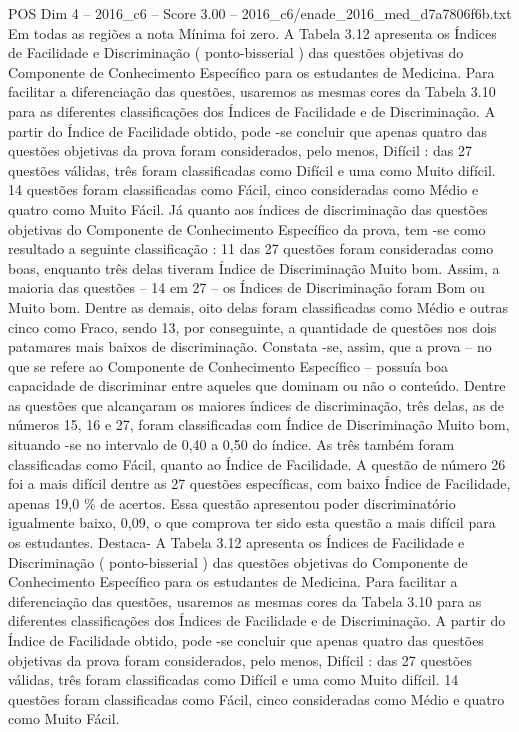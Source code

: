 \begin{textsample}{POS Dim 4 – 2016\_c6 – Score 3.00 – 2016\_c6/enade\_2016\_med\_d7a7806f6b.txt}
Em todas as regiões a nota Mínima foi zero.
A Tabela 3.12 apresenta os Índices de Facilidade e Discriminação ( ponto-bisserial ) das questões objetivas do Componente de Conhecimento Específico para os estudantes de Medicina.
Para facilitar a diferenciação das questões, usaremos as mesmas cores da Tabela 3.10 para as diferentes classificações dos Índices de Facilidade e de Discriminação.
A partir do Índice de Facilidade obtido, pode -se concluir que apenas quatro das questões objetivas da prova foram considerados, pelo menos, Difícil : das 27 questões válidas, três foram classificadas como Difícil e uma como Muito difícil. 14 questões foram classificadas como Fácil, cinco consideradas como Médio e quatro como Muito Fácil.
Já quanto aos índices de discriminação das questões objetivas do Componente de Conhecimento Específico da prova, tem -se como resultado a seguinte classificação : 11 das 27 questões foram consideradas como boas, enquanto três delas tiveram Índice de Discriminação Muito bom.
Assim, a maioria das questões – 14 em 27 – os Índices de Discriminação foram Bom ou Muito bom.
Dentre as demais, oito delas foram classificadas como Médio e outras cinco como Fraco, sendo 13, por conseguinte, a quantidade de questões nos dois patamares mais baixos de discriminação.
Constata -se, assim, que a prova – no que se refere ao Componente de Conhecimento Específico – possuía boa capacidade de discriminar entre aqueles que dominam ou não o conteúdo.
Dentre as questões que alcançaram os maiores índices de discriminação, três delas, as de números 15, 16 e 27, foram classificadas com Índice de Discriminação Muito bom, situando -se no intervalo de 0,40 a 0,50 do índice.
As três também foram classificadas como Fácil, quanto ao Índice de Facilidade.
A questão de número 26 foi a mais difícil dentre as 27 questões específicas, com baixo Índice de Facilidade, apenas 19,0 \% de acertos.
Essa questão apresentou poder discriminatório igualmente baixo, 0,09, o que comprova ter sido esta questão a mais difícil para os estudantes.
Destaca- A Tabela 3.12 apresenta os Índices de Facilidade e Discriminação ( ponto-bisserial ) das questões objetivas do Componente de Conhecimento Específico para os estudantes de Medicina.
Para facilitar a diferenciação das questões, usaremos as mesmas cores da Tabela 3.10 para as diferentes classificações dos Índices de Facilidade e de Discriminação.
A partir do Índice de Facilidade obtido, pode -se concluir que apenas quatro das questões objetivas da prova foram considerados, pelo menos, Difícil : das 27 questões válidas, três foram classificadas como Difícil e uma como Muito difícil. 14 questões foram classificadas como Fácil, cinco consideradas como Médio e quatro como Muito Fácil.

\end{textsample}
